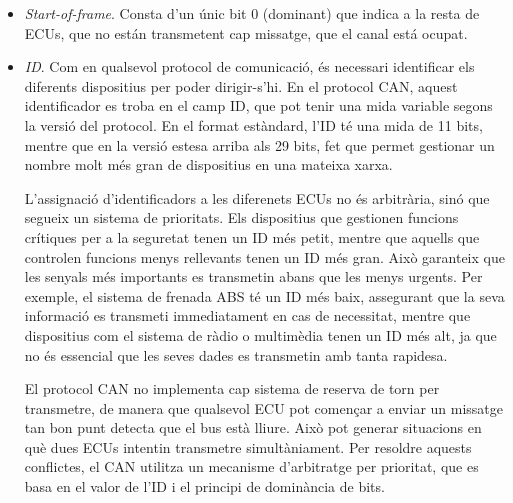 \documentclass{tfgitic}[2024/07/01]
\begin{document}
\begin{itemize}
  \item \emph{Start-of-frame}. Consta d’un únic bit 0 (dominant) que indica a la resta de ECUs, que no están transmetent 
  cap missatge, que el canal está ocupat. 
  \item \emph{ID}. Com en qualsevol protocol de comunicació, és necessari identificar els diferents dispositius per poder 
  dirigir-s'hi. En el protocol CAN, aquest identificador es troba en el camp ID, que pot tenir una mida variable 
  segons la versió del protocol. En el format estàndard, l'ID té una mida de 11 bits, mentre que en la versió estesa 
  arriba als 29 bits, fet que permet gestionar un nombre molt més gran de dispositius en una mateixa xarxa.
  
  L'assignació d'identificadors a les diferenets ECUs no és arbitrària, sinó que segueix un sistema de prioritats. 
  Els dispositius que gestionen funcions crítiques per a la seguretat tenen un ID més petit, mentre que aquells que 
  controlen funcions menys rellevants tenen un ID més gran. Això garanteix que les senyals més importants es transmetin 
  abans que les menys urgents. Per exemple, el sistema de frenada ABS té un ID més baix, assegurant que la seva informació 
  es transmeti immediatament en cas de necessitat, mentre que dispositius com el sistema de ràdio o multimèdia tenen un 
  ID més alt, ja que no és essencial que les seves dades es transmetin amb tanta rapidesa.
  
  El protocol CAN no implementa cap sistema de reserva de torn per transmetre, de manera que qualsevol ECU pot començar 
  a enviar un missatge tan bon punt detecta que el bus està lliure. Això pot generar situacions en què dues ECUs intentin 
  transmetre simultàniament. Per resoldre aquests conflictes, el CAN utilitza un mecanisme d'arbitratge per prioritat, que 
  es basa en el valor de l'ID i el principi de dominància de bits.
  

\end{itemize}
\end{document}
